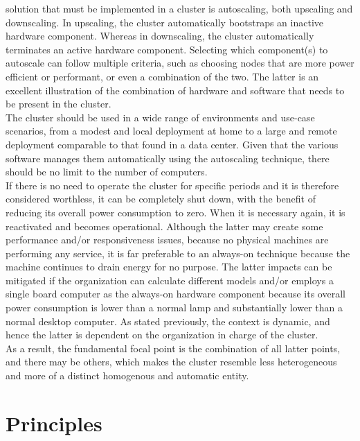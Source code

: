solution that must be implemented in a cluster is autoscaling, both upscaling and
downscaling. In upscaling, the cluster automatically bootstraps an inactive hardware
component. Whereas in downscaling, the cluster automatically terminates an active
hardware component. Selecting which component(s) to autoscale can follow multiple
criteria, such as choosing nodes that are more power efficient or performant, or
even a combination of the two. The latter is an excellent illustration of the
combination of hardware and software that needs to be present in the cluster. \\ %
The cluster should be used in a wide range of environments and use-case
scenarios, from a modest and local deployment at home to a large and remote deployment
comparable to that found in a data center. Given that the various software
manages them automatically using the autoscaling technique, there should be no limit
to the number of computers. \\ %
If there is no need to operate the cluster for specific periods and it is therefore
considered worthless, it can be completely shut down, with the benefit of reducing
its overall power consumption to zero. When it is necessary again, it is reactivated
and becomes operational. Although the latter may create some performance and/or
responsiveness issues, because no physical machines are performing any service,
it is far preferable to an always-on technique because the machine continues to
drain energy for no purpose. The latter impacts can be mitigated if the organization
can calculate different models and/or employs a single board computer as the always-on
hardware component because its overall power consumption is lower than a normal lamp
and substantially lower than a normal desktop computer. As stated previously, the
context is dynamic, and hence the latter is dependent on the organization in
charge of the cluster. \\ %

As a result, the fundamental focal point is the combination of all latter points,
and there may be others, which makes the cluster resemble less heterogeneous and
more of a distinct homogenous and automatic entity.

\section{Principles}
\label{sec:introduction_principles}

